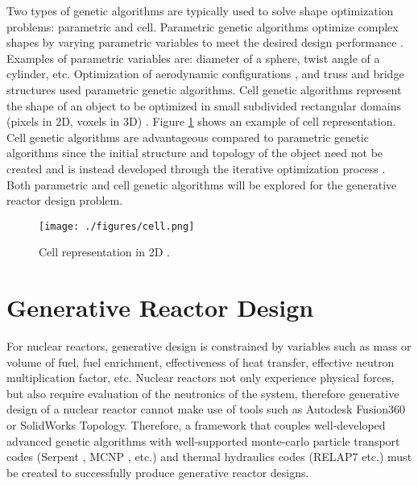 \documentclass[letterpaper,11pt]{article}
\begin{document}
Two types of genetic algorithms are typically used to solve shape 
optimization problems: parametric and cell. 
Parametric genetic algorithms optimize complex shapes by varying parametric variables
to meet the desired design performance \cite{von_buelow_paragen_2012}.
Examples of parametric variables are: diameter of a sphere, twist angle of a cylinder, 
etc.  
Optimization of aerodynamic configurations \cite{makinen_multidisciplinary_1999}, 
and truss and bridge structures \cite{raich_evolving_2000} used parametric 
genetic algorithms.
Cell genetic algorithms represent the shape of an object to be optimized in 
small subdivided rectangular domains (pixels in 2D, voxels in 3D) 
\cite{renner_genetic_2003}. 
Figure \ref{fig:cell} shows an example of cell representation. 
Cell genetic algorithms are advantageous compared to parametric genetic 
algorithms since the initial structure and topology of the object need not 
be created and is instead developed through the iterative optimization 
process \cite{renner_genetic_2003}. 
Both parametric and cell genetic algorithms will be explored for the generative 
reactor design problem. 

\begin{figure}[!htbp]
	\begin{center}
		\texttt{[image: ./figures/cell.png]}
        \end{center}	
        \caption{Cell representation in 2D \cite{renner_genetic_2003}.}
        \label{fig:cell}
\end{figure}

\section{Generative Reactor Design}
For nuclear reactors, generative design is constrained by 
variables such as mass or volume of fuel, fuel enrichment, effectiveness 
of heat transfer, effective neutron multiplication factor, etc. 
Nuclear reactors not only experience physical forces, but also
require evaluation of the neutronics of the system, therefore generative design of 
a nuclear reactor cannot make use of tools such as Autodesk Fusion360 or SolidWorks 
Topology. 
Therefore, a framework that couples well-developed advanced genetic algorithms 
with well-supported monte-carlo particle transport 
codes (Serpent \cite{leppanen_serpent_2014}, 
MCNP \cite{werner_mcnp6._2018}, etc.) and thermal hydraulics 
codes (RELAP7 \cite{andrs_relap-7_2012} etc.)
must be created to successfully produce generative reactor designs. 
\end{document}
